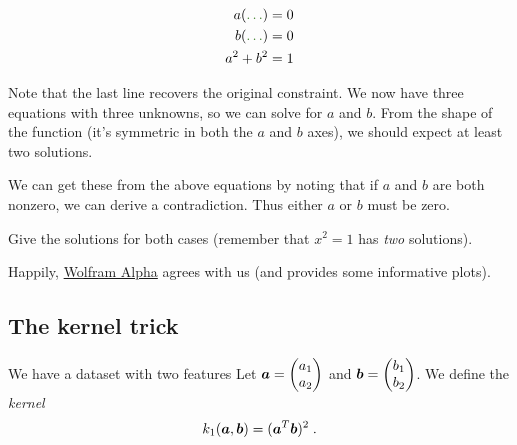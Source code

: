 \documentclass[11pt]{article}
\begin{document}
\begin{align}
a (\ans{2+2\lambda}{\ldots})&= 0\\
b (\ans{4 + 2\lambda}{\ldots})&= 0 \\
a^2 + b^2 &= 1 \label{line:constraint}
\end{align}

Note that the last line recovers the original constraint. We now have three equations with three unknowns, so we can solve for $a$ and $b$. From the shape of the function (it's symmetric in both the $a$ and $b$ axes), we should expect at least two solutions. 

We can get these from the above equations by noting that if $a$ and $b$ are both nonzero, we can derive a contradiction. Thus either $a$ or $b$ must be zero.

\qu Give the solutions for both cases (remember that $x^2 =1$ has \emph{two} solutions).


Happily, \href{https://goo.gl/Uaz5mg}{Wolfram Alpha} agrees with us (and provides some informative plots).


\subsection{The kernel trick}

We have a dataset with two features Let $\bm{a} = \begin{pmatrix}a_1\\ a_2\end{pmatrix}$ and $\bm{b} = \begin{pmatrix}b_1\\ b_2\end{pmatrix}$. We define the \emph{kernel}
\[
k_1(\bm{a}, \bm{b}) = (\bm{a}^T\bm{b})^2 \;\text{.}
\]
\end{document}
